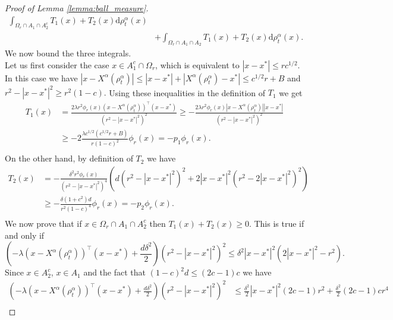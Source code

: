 \documentclass[reqno]{amsart}
\numberwithin{algorithm}{section}
\newcommand{\diff}{\mathrm{d}}
\newcommand{\Xalpha}{{X^\alpha}}
\begin{document}
{\begin{proof}[Proof of Lemma \ref{lemma:ball_measure}]
\begin{equation}
\begin{aligned}
    \int_{\Omega_r\cap A_1\cap A_2^c} T_1(x)+T_2(x)\diff\rho^\alpha_t(x) \\& +
    \int_{\Omega_r\cap A_1\cap A_2} T_1(x)+T_2(x)\diff\rho^\alpha_t(x).  
\end{aligned}\end{equation}
We now bound the three integrals.\\
Let us first consider the case $x\in A_1^c\cap\Omega_r$, which is equivalent to $ |x-x^*|\leq rc^{1/2}.$ In this case we have 
$|x-\Xalpha(\rho^\alpha_t)|\leq |x-x^*|+|\Xalpha(\rho^\alpha_t)-x^*|\leq c^{1/2}r+B$
and $r^2- |x-x^*|^2\geq r^2(1-c).$ Using these inequalities in the definition of $T_1$ we get
\begin{equation}
    \begin{aligned}
        T_1(x) &= \frac{2\lambda r^2\phi_r(x)(x-\Xalpha(\rho^\alpha_t))^\top(x-x^*)}{\left(r^2- |x-x^*|^2\right)^2}\geq-\frac{2\lambda r^2\phi_r(x)|x-\Xalpha(\rho^\alpha_t)| |x-x^*|}{\left(r^2- |x-x^*|^2\right)^2}\\
        &\geq-2\frac{\lambda c^{1/2}(c^{1/2}r+B)}{r(1-c)^2}\phi_r(x) = -p_1\phi_r(x).\\
    \end{aligned}
\end{equation}
On the other hand, by definition of $T_2$ we have
\begin{equation}
    \begin{aligned}
        T_2(x) &= -\frac{\delta^2r^2\phi_r(x)}{\left(r^2- |x-x^*|^2\right)^4}\left(d\left(r^2- |x-x^*|^2\right)^2+2 |x-x^*|^2{\left(r^2-2 |x-x^*|^2\right)^2}\right)\\
        &\geq -\frac{\delta(1+c^2)d}{r^2(1-c)^4}\phi_r(x) = -p_2\phi_r(x).\\
    \end{aligned}
\end{equation}
We now prove that if $x\in \Omega_r\cap A_1\cap A_2^c$ then $T_1(x)+T_2(x)\geq 0.$ This is true if and only if 
\begin{equation}\label{eq:A2_T1T2}
    \left(-\lambda(x-\Xalpha(\rho^\alpha_t))^\top(x-x^*)+\frac{d\delta^2}{2}\right)\left(r^2- |x-x^*|^2\right)^2 \leq \delta^2 |x-x^*|^2\left(2 |x-x^*|^2-r^2\right).
\end{equation}
Since $x\in A_2^c$, $x\in A_1$ and the fact that $(1-c)^2d\leq(2c-1)c$ we have 
\begin{equation*}\begin{aligned}
    \left(-\lambda(x-\Xalpha(\rho^\alpha_t))^\top(x-x^*)+\frac{d\delta^2}{2}\right)\left(r^2- |x-x^*|^2\right)^2 &\leq \frac{\delta^2}{2} |x-x^*|^2(2c-1)r^2 + \frac{\delta^2}{2}(2c-1)cr^4\\

\end{aligned}
\end{equation*}
\end{proof}}
\end{document}
